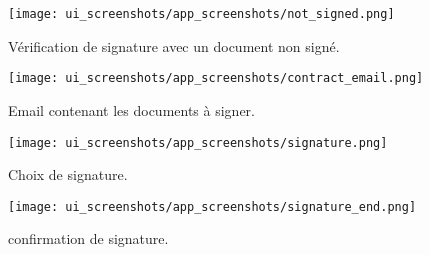 \vspace{1cm}
\begin{multicols}{2}
    \begin{figure}[H]
        \centering
        \texttt{[image: ui\_screenshots/app\_screenshots/not\_signed.png]}
        \captionsetup{justification=centering}
        \caption{Vérification de signature avec un document non signé.}
        \label{fig:not_signed}
    \end{figure}
    \begin{figure}[H]
        \centering
        \texttt{[image: ui\_screenshots/app\_screenshots/contract\_email.png]}
        \captionsetup{justification=centering}
        \caption{Email contenant les documents à signer.}
        \label{fig:sign_documents}
    \end{figure}
\end{multicols}
\vspace{1cm}
\begin{multicols}{2}
    \begin{figure}[H]
        \centering
        \texttt{[image: ui\_screenshots/app\_screenshots/signature.png]}
        \captionsetup{justification=centering}
        \caption{Choix de signature.}
        \label{fig:signature_select}
    \end{figure}
    \begin{figure}[H]
        \centering
        \texttt{[image: ui\_screenshots/app\_screenshots/signature\_end.png]}
        \captionsetup{justification=centering}
        \caption{confirmation de signature.}
        \label{fig:confirm_sig}
    \end{figure}
\end{multicols}
